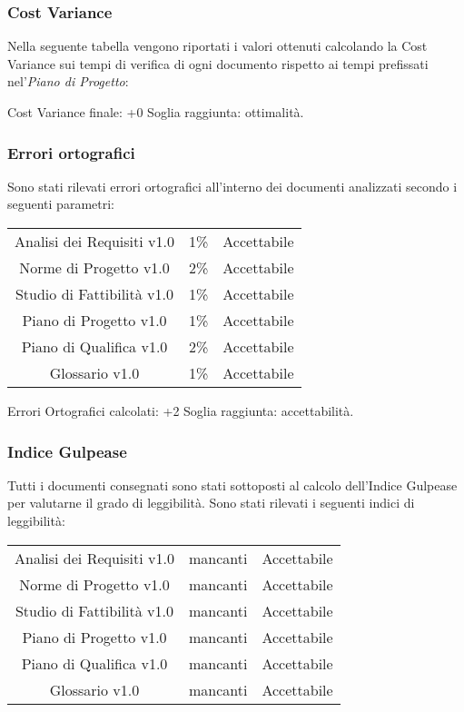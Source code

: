 \subsubsection{Cost Variance}
Nella seguente tabella vengono riportati i valori ottenuti calcolando la Cost Variance sui tempi di verifica di ogni documento rispetto ai tempi prefissati nel'\textit{Piano di Progetto}:


Cost Variance finale: +0%
Soglia raggiunta: ottimalità.


\subsubsection{Errori ortografici}
Sono stati rilevati errori ortografici all'interno dei documenti analizzati secondo i seguenti parametri:

\begin{center}
	\begin{tabular}{| c | C{1cm} | C{3cm} |}
		Analisi dei Requisiti v1.0 & 1\% & Accettabile \\
		Norme di Progetto v1.0 & 2\% & Accettabile\\
		Studio di Fattibilità v1.0 & 1\% &  Accettabile \\
		Piano di Progetto v1.0 & 1\% & Accettabile \\
		Piano di Qualifica v1.0 & 2\% & Accettabile\\
		Glossario v1.0 & 1\% & Accettabile\\
	\end{tabular}
\end{center}

Errori Ortografici calcolati: +2%
Soglia raggiunta: accettabilità.


\subsubsection{Indice Gulpease}

Tutti i documenti consegnati sono stati sottoposti al calcolo dell'Indice Gulpease per valutarne il grado di leggibilità.
Sono stati rilevati i seguenti indici di leggibilità:

\begin{center}
	\begin{tabular}{| c | C{3cm} | C{3cm} |}
		Analisi dei Requisiti v1.0 &  mancanti & Accettabile \\
		Norme di Progetto v1.0 & mancanti & Accettabile\\
		Studio di Fattibilità v1.0 & mancanti & Accettabile\\ 
		Piano di Progetto v1.0 & mancanti & Accettabile \\
		Piano di Qualifica v1.0 & mancanti & Accettabile\\
		Glossario v1.0 & mancanti & Accettabile\\
	 \end{tabular}
\end{center}

